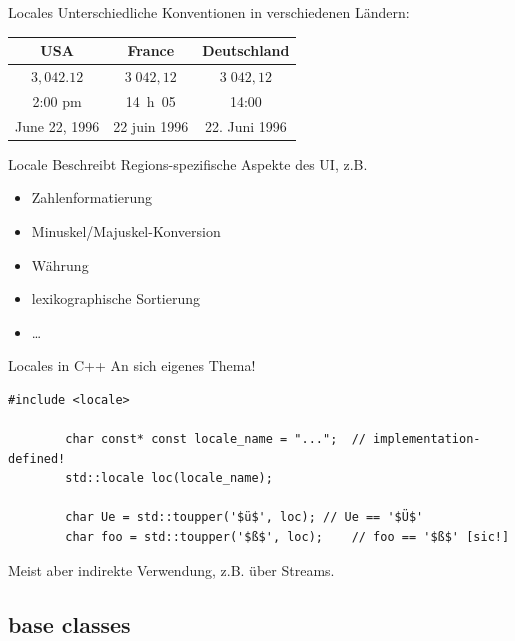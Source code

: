 \begin{frame}{Locales}
	Unterschiedliche Konventionen in verschiedenen Ländern:
	
	\vspace{1em}
	
	\begin{tabular}{c|c|c}
		\textbf{USA}	&	\textbf{France}	&	\textbf{Deutschland}	\\
		\hline
		$3,042.12$		&	$3\;042,12$		&	$3\;042,12$				\\
		2:00 pm			&	14~h~05			&	14:00					\\
		June 22, 1996	&	22 juin 1996	&	22. Juni 1996			\\
	\end{tabular}
	
	\pause
	\vspace{0.5em}
	
	\begin{block}{Locale}
		Beschreibt Regions-spezifische Aspekte des UI, z.B.
		\begin{itemize}
			\item Zahlenformatierung
			\item Minuskel/Majuskel-Konversion
			\item Währung
			\item lexikographische Sortierung
			\item \dots
		\end{itemize}
	\end{block}
\end{frame}

\begin{frame}[fragile]{Locales in C++}
	\alert{ An sich eigenes Thema! }
	
	\pause
	\vspace{2em}
	
	\begin{lstlisting}[escapechar=\$]
		#include <locale>
		
		char const* const locale_name = "...";	// implementation-defined!
		std::locale loc(locale_name);
		
		char Ue = std::toupper('$ü$', loc);	// Ue == '$Ü$'
		char foo = std::toupper('$ß$', loc);	// foo == '$ß$' [sic!]
	\end{lstlisting}
	
	\vspace{1em}
	Meist aber indirekte Verwendung, z.B. über Streams.
\end{frame}


\subsection{base classes}

